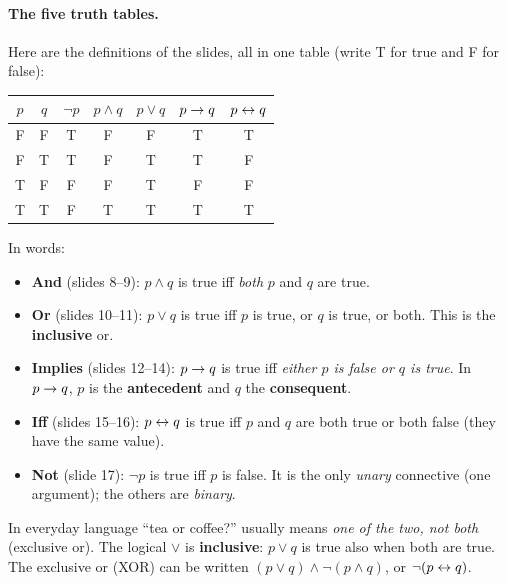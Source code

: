 \paragraph{The five truth tables.} Here are the definitions of the slides, all in one table
(write T for true and F for false):

\begin{center}
\renewcommand{\arraystretch}{1.15}
\begin{tabular}{cc|c|c|c|c|c}
$p$ & $q$ & $\neg p$ & $p \land q$ & $p \lor q$ & $p \rightarrow q$ & $p \leftrightarrow q$ \\
\hline
F & F & T & F & F & \cellcolor{nborange!20}T & T \\
F & T & T & F & T & \cellcolor{nborange!20}T & F \\
T & F & F & F & T & \cellcolor{nbred!20}F & F \\
T & T & F & T & T & T & T \\
\end{tabular}
\end{center}

In words:
\begin{itemize}
  \item \textbf{And} (slides 8--9): $p \land q$ is true iff \emph{both} $p$ and $q$ are true.
  \item \textbf{Or} (slides 10--11): $p \lor q$ is true iff $p$ is true, or $q$ is true, or
        both. This is the \textbf{inclusive} or.
  \item \textbf{Implies} (slides 12--14): $p \rightarrow q$ is true iff \emph{either $p$ is false
        or $q$ is true}. In $p \rightarrow q$, $p$ is the \textbf{antecedent} and $q$ the
        \textbf{consequent}.
  \item \textbf{Iff} (slides 15--16): $p \leftrightarrow q$ is true iff $p$ and $q$ are both true or
        both false (they have the same value).
  \item \textbf{Not} (slide 17): $\neg p$ is true iff $p$ is false. It is the only
        \emph{unary} connective (one argument); the others are \emph{binary}.
\end{itemize}

\begin{nbwarning}
In everyday language ``tea or coffee?'' usually means \emph{one of the two, not both}
(exclusive or). The logical $\lor$ is \textbf{inclusive}: $p \lor q$ is true also when both
are true. The exclusive or (XOR) can be written $(p \lor q) \land \neg(p \land q)$, or
$\neg(p \leftrightarrow q)$.
\end{nbwarning}


